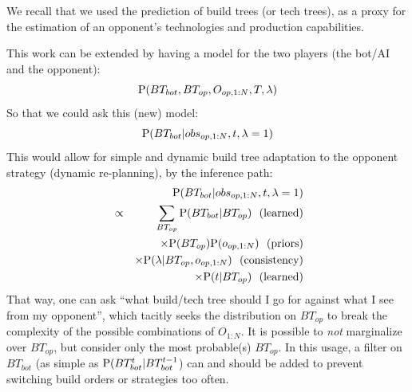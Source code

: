 We recall that we used the prediction of build trees (or tech trees), as a proxy for the estimation of an opponent's technologies and production capabilities.

This work can be extended by having a model for the two players (the bot/AI and the opponent):
$$\mathrm{P}(BT_{bot}, BT_{op}, O_{op,1:N}, T, \lambda)$$
So that we could ask this (new) model: $$\mathrm{P}(BT_{bot} | obs_{op, 1:N}, t, \lambda=1)$$
This would allow for simple and dynamic build tree adaptation to the opponent strategy (dynamic re-planning), by the inference path:
\begin{eqnarray*}
& & \PP(BT_{bot} | obs_{op, 1:N}, t, \lambda=1)\\
& \propto & \sum_{BT_{op}} \PP(BT_{bot} | BT_{op}) \ \ \mathrm{(learned)} \\
& & \times \PP(BT_{op})\PP(o_{op, 1:N}) \ \ \mathrm{(priors)} \\
& & \times \PP(\lambda | BT_{op}, o_{op, 1:N}) \ \ \mathrm{(consistency)} \\
& & \times \PP(t|BT_{op}) \ \ \mathrm{(learned)}
\end{eqnarray*}
That way, one can ask ``what build/tech tree should I go for against what I see from my opponent'', which tacitly seeks the distribution on $BT_{op}$ to break the complexity of the possible combinations of $O_{1:N}$. It is possible to \textit{not} marginalize over $BT_{op}$, but consider only the most probable(s) $BT_{op}$. In this usage, a filter on $BT_{bot}$ (as simple as $\mathrm{P}(BT_{bot}^t | BT_{bot}^{t-1}$) can and should be added to prevent switching build orders or strategies too often.


